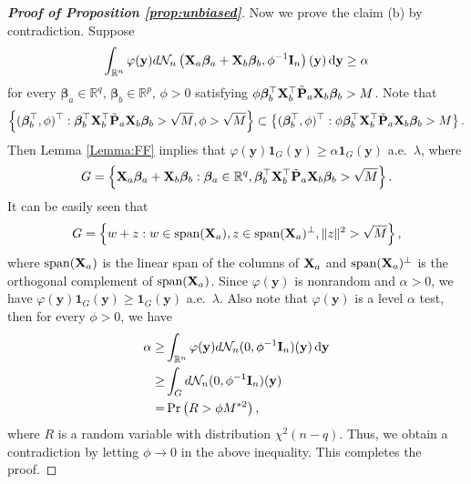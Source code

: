 \documentclass[11pt]{article}
\newcommand{\By}{\mathbf{y}}    \newcommand{\Bz}{\mathbf{z}}
\newcommand{\bfsym}[1]{\ensuremath{\boldsymbol{#1}}}
\def\bbeta{\bfsym \beta}
\theoremstyle{plain}
\theoremstyle{definition}
\theoremstyle{remark}
\begin{document}
\begin{proof}[\textbf{Proof of Proposition \ref{prop:unbiased}}]
    Now we prove the claim (b) by contradiction.
    Suppose
    \begin{equation*}
        \int_{\mathbb R^n} \varphi(\By) d\mathcal N_n \left(\BX_a \bbeta_a + \BX_b \bbeta_b,\phi^{-1} \BI_n\right) (\By)\, \mathrm{d}\By 
        \geq \alpha 
    \end{equation*}
    for every $\bbeta_a\in \mathbb R^q$, $\bbeta_b \in \mathbb R^p$, $\phi>0$ satisfying $\phi \bbeta_b^\top \BX_b^\top \tilde \BP_a \BX_b \bbeta_b >M$.
    Note that
    \begin{equation*}
        \left\{(\bbeta_b^\top, \phi)^\top :  \bbeta_b^\top \BX_b^\top \tilde\BP_a \BX_b \bbeta_b >\sqrt M,\phi>\sqrt M \right\} 
        \subset
        \left\{(\bbeta_b^\top, \phi)^\top :  \phi\bbeta_b^\top \BX_b^\top \tilde\BP_a \BX_b \bbeta_b > M\right\} .
    \end{equation*}
    Then Lemma \ref{Lemma:FF} implies that $\varphi(\By) \mathbf 1_{G}(\By)\geq \alpha \mathbf 1_{G}(\By)$ a.e.\ $\lambda$, where 
    \begin{equation*}
        G=\left\{ \BX_a \bbeta_a + \BX_b \bbeta_b:  \bbeta_a \in \mathbb R^{q},
        \bbeta_b^\top \BX_b^\top \tilde \BP_a \BX_b \bbeta_b >\sqrt M
    \right\}.
    \end{equation*}
    It can be easily seen that
    \begin{equation*}
        G=\left\{
            w+z: w\in \textrm{span}(\mathbf{X}_a), z \in \textrm{span}(\mathbf{X}_a)^{\bot},
            \|z\|^2 > \sqrt{M}
        \right\},
    \end{equation*}
    where $\textrm{span}(\mathbf{X}_a)$ is the linear span of the columns of $\mathbf{X}_a$ and $\textrm{span}(\mathbf{X}_a)^\bot$ is the orthogonal complement of $\textrm{span}(\mathbf{X}_a)$.
    Since $\varphi(\By)$ is nonrandom and $\alpha>0$, we have $\varphi(\By) \mathbf 1_{G}(\By)\geq \mathbf 1_{G}(\By)$ a.e.\ $\lambda$.
    Also note that $\varphi(\By)$ is a level $\alpha$ test, then for every $\phi>0$, we have
    \begin{equation*}
        \begin{split}
            \alpha \geq&
        \int_{\mathbb R^n} \varphi(\By) d\mathcal N_n (0,\phi^{-1} \BI_n)(\By) \,\mathrm{d} \By
        \\
        \geq& 
        \int_{G} d\mathcal N_n (0,\phi^{-1} \BI_n)(\By) 
        \\
        =&\Pr\left( 
            R > \phi M^{*2}
        \right),
        \end{split}
    \end{equation*}
    where $R$ is a random variable with distribution $\chi^2(n-q)$.
    Thus, we obtain a contradiction by letting $\phi\to 0$ in the above inequality.
    This completes the proof.

\end{proof}
\end{document}
